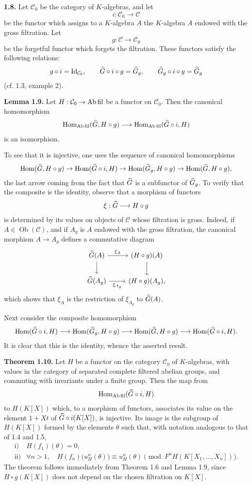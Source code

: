 \documentclass[11pt]{article}
\begin{document}
\textbf{1.8.} Let \(\mathcal C_0\) be the category of \(K\)-algebras, and let
\[
  i:\mathcal C_0\longrightarrow\mathcal C
\]
be the functor which assigns to a \(K\)-algebra \(A\) the \(K\)-algebra \(A\) endowed with the gross filtration. Let
\[
  g:\mathcal C\longrightarrow\mathcal C_0
\]
be the forgetful functor which forgets the filtration. These functors satisfy the following relations:
\[
  g\circ i=\operatorname{Id}_{\mathcal C_0},\qquad
  \widehat G\circ i\circ g=\widehat G_g,\qquad
  \widehat G_g\circ i\circ g=\widehat G_g
\]
(cf. 1.3, example 2).

\textbf{Lemma 1.9.} Let \(H:\mathcal C_0\to\mathrm{Ab\,fil}\) be a functor on \(\mathcal C_0\). Then the canonical homomorphism
\[
  \operatorname{Hom}_{\mathrm{Ab\,fil}}(\widehat G,H\circ g)
  \longrightarrow
  \operatorname{Hom}_{\mathrm{Ab\,fil}}(\widehat G\circ i,H)
\]
is an isomorphism.

To see that it is injective, one uses the sequence of canonical homomorphisms
\[
 \operatorname{Hom}(\widehat G,H\circ g)\to
 \operatorname{Hom}(\widehat G\circ i,H)\to
 \operatorname{Hom}(\widehat G_g,H\circ g)\to
 \operatorname{Hom}(\widehat G,H\circ g),
\]
the last arrow coming from the fact that \(\widehat G\) is a subfunctor of \(\widehat G_g\). To verify that the composite is the identity, observe that a morphism of functors
\[
  \xi:\widehat G\longrightarrow H\circ g
\]
is determined by its values on objects of \(\mathcal C\) whose filtration is gross. Indeed, if \(A\in\operatorname{Ob}(\mathcal C)\), and if \(A_g\) is \(A\) endowed with the gross filtration, the canonical morphism \(A\to A_g\) defines a commutative diagram
\[
\begin{tikzcd}
\Ghat(A) \arrow[r,"\xi_A"] \arrow[d] &
(H\circ g)(A) \arrow[d]\\
\Ghat(A_g) \arrow[r,"\xi_{A_g}"'] &
(H\circ g)(A_g),
\end{tikzcd}
\]
which shows that \(\xi_A\) is the restriction of \(\xi_{A_g}\) to \(\widehat G(A)\).

Next consider the composite homomorphism
\[
  \operatorname{Hom}(\widehat G\circ i,H)\longrightarrow
  \operatorname{Hom}(\widehat G_g,H\circ g)\longrightarrow
  \operatorname{Hom}(\widehat G,H\circ g)\longrightarrow
  \operatorname{Hom}(\widehat G\circ i,H).
\]
It is clear that this is the identity, whence the asserted result.

\textbf{Theorem 1.10.} Let \(H\) be a functor on the category \(\mathcal C_0\) of \(K\)-algebras, with values in the category of separated complete filtered abelian groups, and commuting with invariants under a finite group. Then the map from
\[
  \operatorname{Hom}_{\mathrm{Ab\,fil}}(\widehat G\circ i,H)
\]
to \(H(K[X])\) which, to a morphism of functors, associates its value on the element \(1+Xt\) of \(\widehat G\circ i(K[X])\), is injective. Its image is the subgroup of \(H(K[X])\) formed by the elements \(\theta\) such that, with notation analogous to that of 1.4 and 1.5,
\[
\begin{array}{ll}
\text{i)}& H(f_1)(\theta)=0,\\[0.3em]
\text{ii)}& \forall n>1,\quad
 H(f_n)\bigl(u_H^n(\theta)\bigr)\equiv u_H^n(\theta)
 \pmod{F^nH(K[X_1,\ldots,X_n])}.
\end{array}
\]
The theorem follows immediately from Theorem 1.6 and Lemma 1.9, since \(H\circ g(K[X])\) does not depend on the chosen filtration on \(K[X]\).
\end{document}
